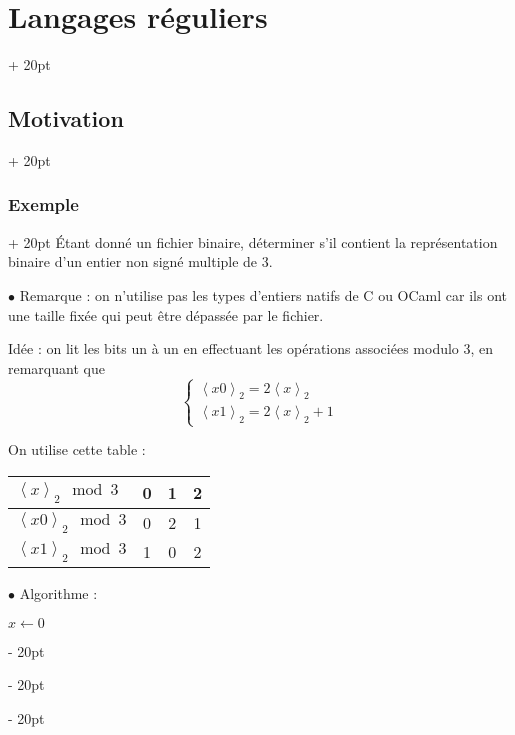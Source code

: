\documentclass[a4paper, 12pt, twoside]{article}
\newenvironment{indalgo}[2][H]{
    \begin{algoBox}
        \begin{algorithm}[#1]
            \caption{#2}
}
{
        \end{algorithm}
    \end{algoBox}
}
\newcommand{\lrangle}[1]{\left\langle #1 \right\rangle}
\newcommand{\ind}[1][20pt]{\advance\leftskip + #1}
\newcommand{\deind}[1][20pt]{\advance\leftskip - #1}
\newenvironment{indt}[2][20pt]{#2 \par \ind[#1]}{\par \deind} %
\begin{document}
\begin{indt}{\section{Langages réguliers}}
\begin{indt}{\subsection{Motivation}}
\begin{indt}{\subsubsection{Exemple}}
                \'Etant donné un fichier binaire, déterminer s'il contient la représentation binaire d'un entier non signé multiple de 3.

                \vspace{6pt}
                
                $\bullet$ Remarque : on n'utilise pas les types d'entiers natifs de C ou OCaml car ils ont une taille fixée qui peut être dépassée par le fichier.

                \vspace{6pt}
                
                Idée : on lit les bits un à un en effectuant les opérations associées modulo 3, en remarquant que
                \[
                    \begin{cases}
                        \lrangle{x 0}_2 = 2\lrangle x _2
                        \\
                        \lrangle{x 1}_2 = 2\lrangle x _2 + 1
                    \end{cases}
                \]

                On utilise cette table :

                \begin{center}
                    \begin{tabular}{|l|c|c|c|}
                        \hline
                        $\lrangle x _2 \mod 3$ & 0 & 1 & 2
                        \\
                        \hline
                        $\lrangle{x 0}_2 \mod 3$ & 0 & 2 & 1
                        \\
                        \hline
                        $\lrangle{x 1}_2 \mod 3$ & 1 & 0 & 2
                        \\
                        \hline
                    \end{tabular}
                \end{center}

                $\bullet$ Algorithme :

                \begin{indalgo}{Exemple}
                    \label{alg:1}

                    $x \gets 0$\;



\end{indalgo}
\end{indt}
\end{indt}
\end{indt}
\end{document}

